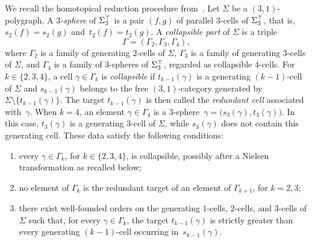 \documentclass[a4paper, twoside, 11pt, english]{article}
\begin{document}
We recall the homotopical reduction procedure
from~\cite{GaussentGuiraudMalbos15}. Let $\Sigma$ be a
$(3,1)$-polygraph. A \emph{$3$-sphere} of $\Sigma^{\top}_3$ is a pair
$(f,g)$ of parallel $3$-cells of $\Sigma^{\top}_3$, that is,
$s_2(f)=s_2(g)$ and~$t_2(f)=t_2(g)$.
A \emph{collapsible part} of $\Sigma$ is a triple
\[
\Gamma=(\Gamma_2,\Gamma_3,\Gamma_4),
\]
where $\Gamma_2$ is a family of generating $2$-cells of $\Sigma$,
$\Gamma_3$ is a family of generating $3$-cells of $\Sigma$, and
$\Gamma_4$ is a family of $3$-spheres of $\Sigma^{\top}_3$, regarded as
collapsible $4$-cells.
For $k\in\{2,3,4\}$, a cell $\gamma\in\Gamma_k$ is
\emph{collapsible} if $t_{k-1}(\gamma)$ is a generating
$(k-1)$-cell of $\Sigma$ and $s_{k-1}(\gamma)$ belongs to the free
$(3,1)$-category generated by
$\Sigma\setminus\{t_{k-1}(\gamma)\}$.
The target $t_{k-1}(\gamma)$ is then called the
\emph{redundant cell} associated with~$\gamma$.
When $k=4$, an element $\gamma\in\Gamma_4$ is a $3$-sphere~$
\gamma
=
\bigl(
s_3(\gamma),
t_3(\gamma)
\bigr)$.
In this case, $t_3(\gamma)$ is a generating $3$-cell of $\Sigma$, while
$s_3(\gamma)$ does not contain this generating cell.
These data satisfy the following conditions:
\begin{enumerate}[\bf i)]
\item every $\gamma\in\Gamma_k$, for $k\in\{2,3,4\}$, is
collapsible, possibly after a Nielsen transformation as recalled below;
\item no element of $\Gamma_k$ is the redundant target of an element
of $\Gamma_{k+1}$, for $k=2,3$;
\item there exist well-founded orders on the generating $1$-cells,
$2$-cells, and $3$-cells of $\Sigma$ such that, for every
$\gamma\in\Gamma_k$, the target $t_{k-1}(\gamma)$ is strictly greater
than every generating $(k-1)$-cell occurring in~$s_{k-1}(\gamma)$.
\end{enumerate}
\end{document}
